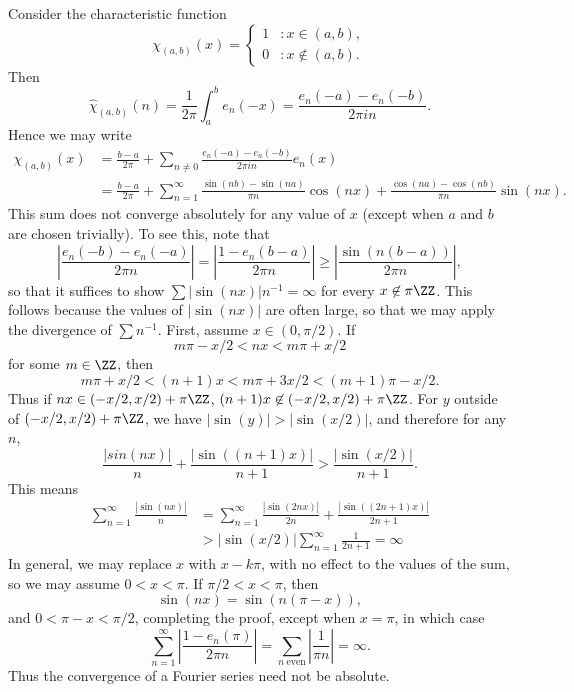 \begin{example}
    Consider the characteristic function
    \[ \chi_{(a,b)}(x) = \begin{cases} 1 & : x \in (a,b), \\ 0 & : x \not \in (a,b). \end{cases} \]
    Then
    \[ \widehat{\chi}_{(a,b)}(n) = \frac{1}{2\pi} \int_a^b e_n(-x) = \frac{e_n(-a) - e_n(-b)}{2\pi i n}. \]
    Hence we may write
    \begin{align*}
        \chi_{(a,b)}(x) &= \frac{b-a}{2\pi} + \sum_{n \neq 0} \frac{e_n(-a) - e_n(-b)}{2 \pi i n} e_n(x)\\
        &= \frac{b-a}{2\pi} + \sum_{n = 1}^\infty \frac{\sin(nb) - \sin(na)}{\pi n} \cos(nx) + \frac{\cos(na) - \cos(nb)}{\pi n} \sin(nx).
    \end{align*}
    This sum does not converge absolutely for any value of $x$ (except when $a$ and $b$ are chosen trivially). To see this, note that
    \[ \left|\frac{e_n(-b) - e_n(-a)}{2 \pi n}\right| = \left| \frac{1 - e_n(b-a)}{2 \pi n} \right| \geq \left| \frac{\sin(n(b-a))}{2 \pi n} \right|, \]
    so that it suffices to show $\sum |\sin(nx)| n^{-1} = \infty$ for every $x \not \in \pi \ZZ$. This follows because the values of $|\sin(nx)|$ are often large, so that we may apply the divergence of $\sum n^{-1}$. First, assume $x \in (0,\pi/2)$. If
    \[ m \pi - x/2 < nx < m \pi + x/2 \]
    for some $m \in \ZZ$, then
    \[ m \pi + x/2 < (n+1)x < m \pi + 3x/2 < (m+1) \pi - x/2. \]
    Thus if $nx \in (-x/2,x/2) + \pi \ZZ$, $(n+1)x \not \in (-x/2,x/2) + \pi \ZZ$. For $y$ outside of $(-x/2,x/2) + \pi \ZZ$, we have $|\sin(y)| > |\sin(x/2)|$, and therefore for any $n$,
    \[ \frac{|sin(nx)|}{n} + \frac{|\sin((n+1)x)|}{n+1} > \frac{|\sin(x/2)|}{n+1}. \]
    This means
    \begin{align*}
        \sum_{n = 1}^\infty \frac{|\sin(nx)|}{n} &= \sum_{n = 1}^\infty \frac{|\sin(2nx)|}{2n} + \frac{|\sin((2n+1)x)|}{2n+1}\\
        &> |\sin(x/2)| \sum_{n = 1}^\infty \frac{1}{2n+1} = \infty
    \end{align*}
    In general, we may replace $x$ with $x - k \pi$, with no effect to the values of the sum, so we may assume $0 < x < \pi$. If $\pi/2 < x < \pi$, then
    \[ \sin(nx) = \sin(n(\pi - x)), \]
    and $0 < \pi - x < \pi/2$, completing the proof, except when $x = \pi$, in which case
    \[ \sum_{n = 1}^\infty \left| \frac{1 - e_n(\pi)}{2 \pi n} \right| = \sum_{n\ \text{even}} \left| \frac{1}{\pi n} \right| = \infty. \]
    Thus the convergence of a Fourier series need not be absolute.
\end{example}

